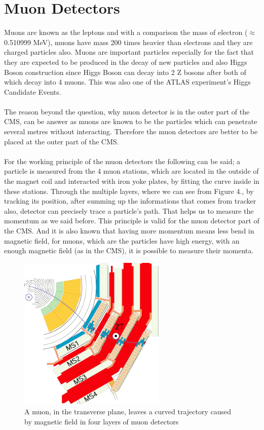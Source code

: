 \documentclass[11pt, oneside]{article}   	%
\begin{document}
\section{Muon Detectors}

Muons are known as the leptons and with a comparison the mass of electron
($\approx$0.510999 MeV), muons have mass 200 times heavier than electrons
and they are charged particles also. Muons are important particles 
especially for the fact that they are expected to be produced in the
decay of new particles and also Higgs Boson construction since Higgs
Boson can decay into 2 Z bosons after both of which decay into 4 muons. This was also one of the
ATLAS experiment's Higgs Candidate Events.
\\\\
The reason beyond the question, why muon detector is in the outer part
of the CMS, can be answer as muons are known to be the particles which
can penetrate several metres without interacting. Therefore the muon 
detectors are better to be placed at the outer part of the CMS.
\\\\
For the working principle of the muon detectors the following can be said; a particle is measured from the 4 muon stations, which are
located in the outside of the magnet  coil and interacted with iron yoke plates, by fitting the curve inside in these stations.
Through the multiple layers, where we can see from Figure 4., by tracking its position, after summing up the informations that comes from tracker
also, detector can precisely trace a particle's path. That helps us to measure the momentum as we said before. This principle is valid for 
the muon detector part of the CMS. And it is also known that having more momentum means less bend in magnetic field, for muons, which are
the particles have high energy, with an enough magnetic field (as in the CMS), it is possible to measure their momenta.

\begin{figure}[H]
\begin{center}
\includegraphics[width=7cm]{ll.png}
\end{center}
\caption{A muon, in the transverse plane, leaves a curved trajectory caused by magnetic field in four layers of muon detectors }
\end{figure}
\end{document}
